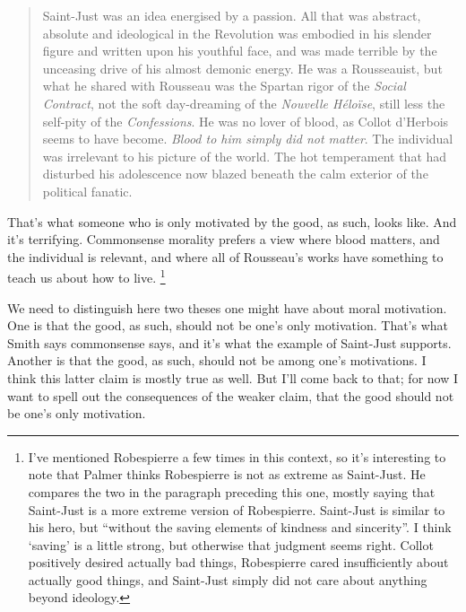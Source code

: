 \begin{quote}
Saint-Just was an idea energised by a passion. All that was abstract, absolute and ideological in the Revolution was embodied in his slender figure and written upon his youthful face, and was made terrible by the unceasing drive of his almost demonic energy. He was a Rousseauist, but what he shared with Rousseau was the Spartan rigor of the \emph{Social Contract}, not the soft day-dreaming of the \emph{Nouvelle Héloïse}, still less the self-pity of the \emph{Confessions}. He was no lover of blood, as Collot d'Herbois seems to have become. \emph{Blood to him simply did not matter}. The individual was irrelevant to his picture of the world. The hot temperament that had disturbed his adolescence now blazed beneath the calm exterior of the political fanatic. ~\citep[74, emphasis added]{Palmer1941}
\end{quote}
That's what someone who is only motivated by the good, as such, looks like. And it's terrifying. Commonsense morality prefers a view where blood matters, and the individual is relevant, and where all of Rousseau's works have something to teach us about how to live. \footnote{I've mentioned \gls{Robespierre} a few times in this context, so it's interesting to note that Palmer thinks \gls{Robespierre} is not as extreme as \gls{Saint-Just}. He compares the two in the paragraph preceding this one, mostly saying that \gls{Saint-Just} is a more extreme version of \gls{Robespierre}. \gls{Saint-Just} is similar to his hero, but ``without the saving elements of kindness and sincerity''. I think `saving' is a little strong, but otherwise that judgment seems right. Collot positively desired actually bad things, \gls{Robespierre} cared insufficiently about actually good things, and \gls{Saint-Just} simply did not care about anything beyond ideology.}

We need to distinguish here two theses one might have about moral motivation. One is that the good, as such, should not be one's only motivation. That's what Smith says commonsense says, and it's what the example of \gls{Saint-Just} supports. Another is that the good, as such, should not be among one's motivations. I think this latter claim is mostly true as well. But I'll come back to that; for now I want to spell out the consequences of the weaker claim, that the good should not be one's only motivation.

